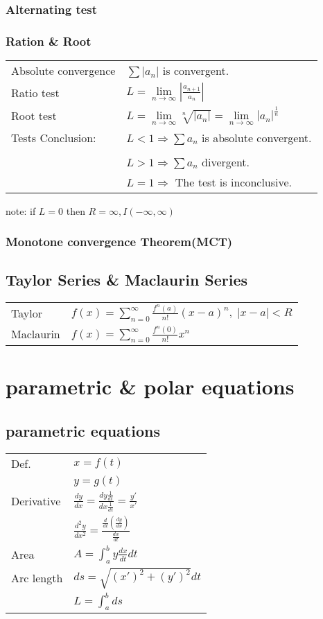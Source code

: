 \documentclass[5pt]{article}
\begin{document}
\begin{multicols}{2}
\subsubsection{Alternating test}


\subsubsection{Ration \& Root}
\begin{tabular}{ll}
Absolute convergence & $\sum |a_n|$ is convergent.\\ 
Ratio test & \(L=\lim\limits_{n\to\infty} |\frac{a_{n+1}}{a_n}| \)\\
Root test & \(L=\lim\limits_{n\to\infty} \sqrt[n]{|a_n|}=\lim\limits_{n\to\infty}|a_n|^{\frac{1}{n}} \)\\
Tests Conclusion: & $L < 1 \Rightarrow \sum a_n$ is absolute convergent.\\\\
 & $L > 1 \Rightarrow \sum a_n$ divergent.\\
 & $L = 1 \Rightarrow$ The test is inconclusive.\\
\end{tabular}
note: if $L = 0$ then $R=\infty, I(-\infty,\infty)$


\subsubsection{Monotone convergence Theorem(MCT)}


\subsection{Taylor Series \& Maclaurin Series}
\begin{tabular}{ll}
    Taylor &  $f(x)=\sum_{n=0}^\infty\frac{f^n(a)}{n!}(x-a)^n, \; |x-a|<R$\\
    Maclaurin & $f(x)=\sum^\infty_{n=0}\frac{f^n(0)}{n!}x^n$\\
\end{tabular}

\section{parametric \& polar equations}
\subsection{parametric equations}
\begin{tabular}{ll}
    Def. & $x=f(t)$ \\
         & $y=g(t)$ \\         
    Derivative & $\frac{dy}{dx}=\frac{dy\frac{1}{dt}}{dx\frac{1}{dt}}=\frac{y'}{x'}$ \\
    & $\frac{d^2y}{dx^2}=\frac{\frac{d}{dt}(\frac{dy}{dx})}{\frac{dx}{dt}}$\\
    Area & $A=\int_a^by\frac{dx}{dt}dt$\\
    Arc length & $ds=\sqrt{(x')^2+(y')^2}dt$\\
    & $L=\int^b_ads$\\
\end{tabular}

\end{multicols}
\end{document}
